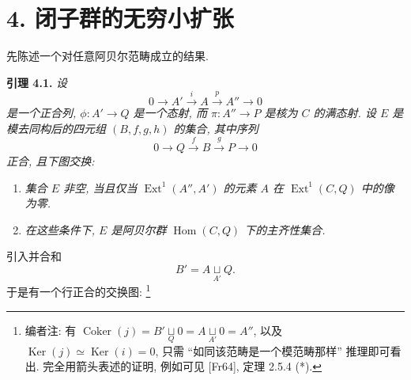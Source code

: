 
\setcounter{footnote}{73}

\section*{4. 闭子群的无穷小扩张}

先陈述一个对任意阿贝尔范畴成立的结果.

\medskip
\noindent{}\textbf{引理 4.1.}
\textit{设
\[
 0\longrightarrow A'\xrightarrow{i}A\xrightarrow{p}A''\longrightarrow0
\]
是一个正合列, \(\phi:A'\to Q\) 是一个态射,
而 \(\pi:A''\to P\) 是核为 \(C\) 的满态射.
设 \(E\) 是模去同构后的四元组 \((B,f,g,h)\) 的集合,
其中序列
\[
 0\longrightarrow Q\xrightarrow{f}B\xrightarrow{g}P\longrightarrow0
\]
正合, 且下图交换:}

\begin{center}
\end{center}

\begin{enumerate}
\item[(i)] \textit{集合 \(E\) 非空, 当且仅当
\(\operatorname{Ext}^1(A'',A')\) 的元素 \(A\)
在 \(\operatorname{Ext}^1(C,Q)\) 中的像为零.}
\item[\SGAInlineRefTarget{sga3:iii:lemma:4-1:item:ii}(ii)]
\textit{在这些条件下, \(E\) 是阿贝尔群
\(\operatorname{Hom}(C,Q)\) 下的主齐性集合.}
\end{enumerate}

引入并合和
\[
 B'=A\mathop{\sqcup}\limits_{A'}Q.
\]
于是有一个行正合的交换图:
\footnote{编者注: 有
\(\operatorname{Coker}(j)=B'\mathop{\sqcup}\limits_Q0
=A\mathop{\sqcup}\limits_{A'}0=A''\),
以及 \(\operatorname{Ker}(j)\simeq\operatorname{Ker}(i)=0\),
只需 ``如同该范畴是一个模范畴那样'' 推理即可看出.
完全用箭头表述的证明, 例如可见 [Fr64], 定理 2.5.4 (*).}

